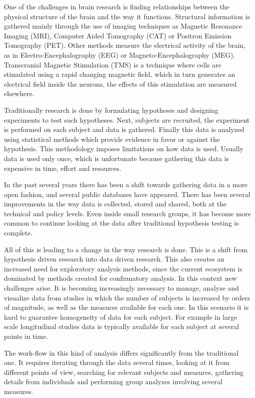 

One of the challenges in brain research is finding relationships between the physical structure of the brain and the way it functions. Structural information is gathered mainly through the use of imaging techniques as Magnetic Resonance Imaging (MRI), Computer Aided Tomography (CAT) or Positron Emission Tomography (PET). Other methods measure the electrical activity of the brain, as in Electro-Encephalography  (EEG) or Magneto-Encephalography (MEG). Transcranial Magnetic Stimulation (TMS) is a technique where cells are stimulated using a rapid changing magnetic field, which in turn generates an electrical field inside the neurons, the effects of this stimulation are measured elsewhere.

Traditionally research is done by formulating hypotheses and designing experiments to test such hypotheses. Next, subjects are recruited, the experiment is performed on each subject and data is gathered. Finally this data is analyzed using statistical methods which provide evidence in favor or against the hypothesis. This methodology imposes limitations on how data is used. Usually data is used only once, which is unfortunate because gathering this data is expensive in time, effort and resources.

In the past several years there has been a shift towards gathering data in a more open fashion, and several public databases have appeared. There has been several improvements in the way data is collected, stored and shared, both at the technical and policy levels. Even inside small research groups, it has become more common to continue looking at the data after traditional hypothesis testing is complete.

All of this is leading to a change in the way research is done. This is a shift from hypothesis driven research into data driven research. This also creates an increased need for exploratory analysis methods, since the current ecosystem is dominated by methods created for confirmatory analysis. In this context new challenges arise. It is becoming increasingly necessary to manage, analyze and visualize data from studies in which the number of subjects is increased by orders of magnitude, as well as the measures available for each one. In this scenario it is hard to guarantee homogeneity of data for each subject. For example in large scale longitudinal studies data is typically available for each subject at several points in time.

The work-flow in this kind of analysis differs significantly from the traditional one. It requires iterating through the data several times, looking at it from different points of view, searching for relevant subjects and measures, gathering details from individuals and performing group analyzes involving several measures.

